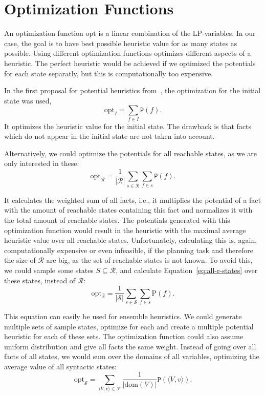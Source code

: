 \section{Optimization Functions}\label{sec:optimization}
An optimization function $\mathrm{opt}$ is a linear combination of the LP-variables.
In our case, the goal is to have best possible heuristic value for as many states as possible.
Using different optimization functions optimizes different aspects of a heuristic.
The perfect heuristic would be achieved if we optimized the potentials for each state separatly, but this is computationally too expensive.

In the first proposal for potential heuristics from~\cite{pommerening2015non}, the optimization for the initial state was used,
\begin{equation}\mathrm{opt}_I=\sum_{f\in I}\mathtt{P}(f).\label{eq:initial-state}\end{equation}
It optimizes the heuristic value for the initial state.
The drawback is that facts which do not appear in the initial state are not taken into account.

Alternatively, we could optimize the potentials for all reachable states, as we are only interested in these:
\begin{equation}\mathrm{opt}_\mathcal{R} = \frac{1}{|\mathcal{R}|}\sum_{s\in\mathcal{R}}\sum_{f\in s}\mathtt{P}(f).\label{eq:all-r-states}\end{equation}

It calculates the weighted sum of all facts, i.e., it multiplies the potential of a fact with the amount of reachable states containing this fact and normalizes it with the total amount of reachable states.
The potentials generated with this optimization function would result in the heuristic with the maximal average heuristic value over all reachable states.
Unfortunately, calculating this is, again, computationally expensive or even infeasible, if the planning task and therefore the size of $\mathcal{R}$ are big, as the set of reachable states is not known.
To avoid this, we could sample some states $S\subseteq\mathcal{R}$, and calculate Equation~\eqref{eq:all-r-states} over these states, instead of $\mathcal{R}$:
\begin{equation} \mathrm{opt}_\mathcal{\hat{S}}=\frac{1}{|\mathcal{S}|}\sum_{s\in\mathcal{S}}\sum_{f\in s} \mathrm{P}(f).\label{eq:all-states}\end{equation}

This equation can easily be used for ensemble heuristics.
We could generate multiple sets of sample states, optimize for each and create a multiple potential heuristic for each of these sets.
The optimization function could also assume uniform distribution and give all facts the same weight.
Instead of going over all facts of all states, we would sum over the domains of all variables, optimizing the average value of all syntactic states:
\begin{equation} \mathrm{opt}_\mathcal{S}=\sum_{\langle V,v \rangle\in\mathcal{F}}\frac{1}{|\mathrm{dom}(V)|}\mathtt{P}(\langle V,v \rangle).\label{eq:uniform-opt}\end{equation}

